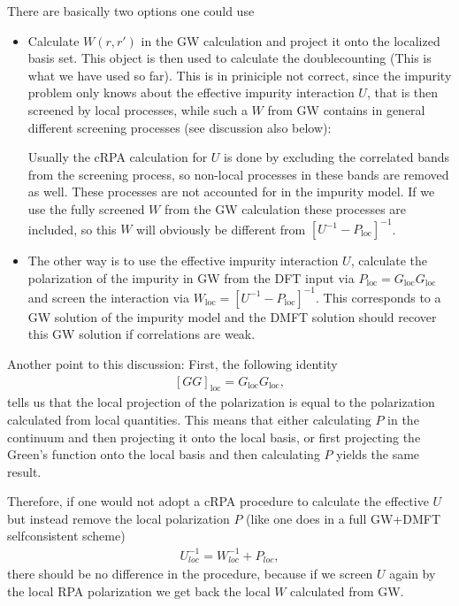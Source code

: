 \documentclass[12pt,a4paper]{scrartcl}
\numberwithin{equation}{section}
\begin{document}
There are basically two options one could use
\begin{itemize}
 \item Calculate $W(r,r')$ in the GW calculation and project it
 onto the localized basis set. This object is then used to calculate the 
 doublecounting (This is what we have used so far).
 This is in priniciple not correct, since the impurity problem
 only knows about the effective impurity interaction $U$, that is then
 screened by local processes, while such a $W$ from GW contains in general
 different screening processes (see discussion also below):
 
 Usually the cRPA calculation for $U$ is done by excluding the correlated bands 
 from the screening process, so non-local processes in these bands are removed as well.
 These processes are not accounted for in the impurity model. If we use the fully screened
 $W$ from the GW calculation these processes are included, so this $W$ will obviously
 be different from $[U^{-1} - P_{\mathrm{loc}} ]^{-1}$. 
 
 \item The other way is to use the effective impurity interaction $U$, calculate
 the polarization of the impurity in GW from the DFT input via
 $P_{\mathrm{loc}} = G_{\mathrm{loc}}G_{\mathrm{loc}}$ and screen the interaction
 via $W_{\mathrm{loc}} = [U^{-1} - P_{\mathrm{loc}} ]^{-1}$.
 This corresponds to a GW solution of the impurity model and the DMFT solution should
 recover this GW solution if correlations are weak. 
\end{itemize}

Another point to this discussion:
First, the following identity
\begin{align}
 \left[ GG \right]_{\mathrm{loc}} = G_{\mathrm{loc}}G_{\mathrm{loc}},
\end{align}
tells us that the local projection of the polarization is equal
to the polarization calculated from local quantities.
This means that either calculating $P$ in the continuum and then projecting
it onto the local basis, or first projecting the Green's function onto the local basis
and then calculating $P$ yields the same result. 

Therefore, if one would not adopt a cRPA procedure to calculate the effective $U$
but instead remove the local polarization $P$ (like one does in a full GW+DMFT selfconsistent scheme)
\begin{align}
 U^{-1}_{loc} = W^{-1}_{loc} + P_{loc},
\end{align}
there should be no difference in the procedure, because if we screen $U$ again by
the local RPA polarization we get back the local $W$ calculated from GW.
\end{document}
